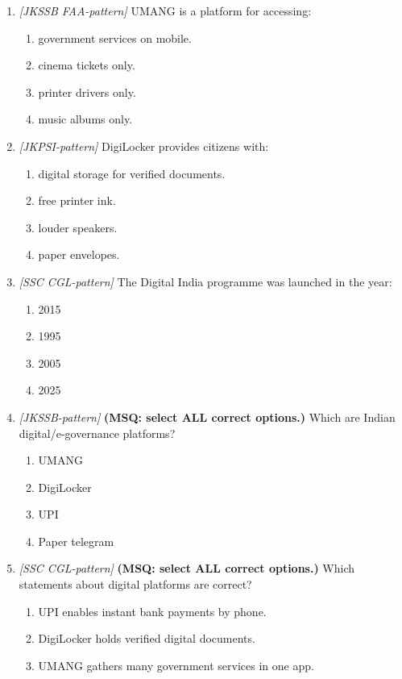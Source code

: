 \begin{enumerate}[label=\textbf{Q\arabic*.}, leftmargin=*]
\item \textit{[JKSSB FAA-pattern]} UMANG is a platform for accessing:
  \begin{enumerate}[label=\Alph*.]
    \item government services on mobile.
    \item cinema tickets only.
    \item printer drivers only.
    \item music albums only.
  \end{enumerate}
\item \textit{[JKPSI-pattern]} DigiLocker provides citizens with:
  \begin{enumerate}[label=\Alph*.]
    \item digital storage for verified documents.
    \item free printer ink.
    \item louder speakers.
    \item paper envelopes.
  \end{enumerate}
\item \textit{[SSC CGL-pattern]} The Digital India programme was launched in the year:
  \begin{enumerate}[label=\Alph*.]
    \item 2015
    \item 1995
    \item 2005
    \item 2025
  \end{enumerate}
\item \textit{[JKSSB-pattern]} \textbf{(MSQ: select ALL correct options.)} Which are Indian digital/e-governance platforms?
  \begin{enumerate}[label=\Alph*.]
    \item UMANG
    \item DigiLocker
    \item UPI
    \item Paper telegram
  \end{enumerate}
\item \textit{[SSC CGL-pattern]} \textbf{(MSQ: select ALL correct options.)} Which statements about digital platforms are correct?
  \begin{enumerate}[label=\Alph*.]
    \item UPI enables instant bank payments by phone.
    \item DigiLocker holds verified digital documents.
    \item UMANG gathers many government services in one app.

\end{enumerate}
\end{enumerate}
